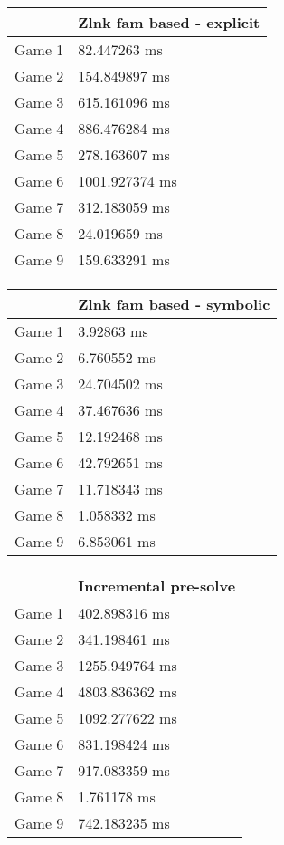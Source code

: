 \begin{tabular}{|l|l|}
	\hline
	& Zlnk fam based - explicit \\ \hline
	Game 1 & 82.447263 ms \\ \hline
	Game 2 & 154.849897 ms \\ \hline
	Game 3 & 615.161096 ms \\ \hline
	Game 4 & 886.476284 ms \\ \hline
	Game 5 & 278.163607 ms \\ \hline
	Game 6 & 1001.927374 ms \\ \hline
	Game 7 & 312.183059 ms \\ \hline
	Game 8 & 24.019659 ms \\ \hline
	Game 9 & 159.633291 ms \\ \hline
\end{tabular}
\begin{tabular}{|l|l|}
	\hline
	& Zlnk fam based - symbolic \\ \hline
	Game 1 & 3.92863 ms \\ \hline
	Game 2 & 6.760552 ms \\ \hline
	Game 3 & 24.704502 ms \\ \hline
	Game 4 & 37.467636 ms \\ \hline
	Game 5 & 12.192468 ms \\ \hline
	Game 6 & 42.792651 ms \\ \hline
	Game 7 & 11.718343 ms \\ \hline
	Game 8 & 1.058332 ms \\ \hline
	Game 9 & 6.853061 ms \\ \hline
\end{tabular}
\begin{tabular}{|l|l|}
	\hline
	& Incremental pre-solve \\ \hline
	Game 1 & 402.898316 ms \\ \hline
	Game 2 & 341.198461 ms \\ \hline
	Game 3 & 1255.949764 ms \\ \hline
	Game 4 & 4803.836362 ms \\ \hline
	Game 5 & 1092.277622 ms \\ \hline
	Game 6 & 831.198424 ms \\ \hline
	Game 7 & 917.083359 ms \\ \hline
	Game 8 & 1.761178 ms \\ \hline
	Game 9 & 742.183235 ms \\ \hline
\end{tabular}
